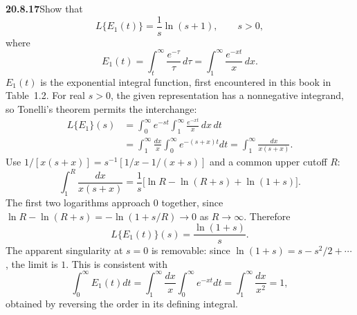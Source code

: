\par\bigskip
\noindent\textbf{20.8.17}\quad Show that
\[
L\{E_{1}(t)\}=\frac{1}{s}\ln(s+1),\qquad s>0,
\]
where
\[
E_{1}(t)=\int_{t}^{\infty}\frac{e^{-\tau}}{\tau}\,d\tau
=\int_{1}^{\infty}\frac{e^{-xt}}{x}\,dx.
\]
$E_{1}(t)$ is the exponential integral function, first
encountered in this book in Table~1.2.
\solution
For real $s>0$, the given representation has a
nonnegative integrand, so Tonelli's theorem permits the
interchange:
\begin{align*}
L\{E_1\}(s)
&=\int_0^\infty e^{-st}\int_1^\infty\frac{e^{-xt}}x\,dx\,dt\\
&=\int_1^\infty\frac{dx}{x}\int_0^\infty e^{-(s+x)t}dt
=\int_1^\infty\frac{dx}{x(s+x)}.
\end{align*}
Use $1/[x(s+x)]=s^{-1}[1/x-1/(x+s)]$ and a common upper
cutoff $R$:
\[
\int_1^R\frac{dx}{x(s+x)}
=\frac1s\big[\ln R-\ln(R+s)+\ln(1+s)\big].
\]
The first two logarithms approach $0$ together, since
$\ln R-\ln(R+s)=-\ln(1+s/R)\to0$ as $R\to\infty$. Therefore
\[
\boxed{L\{E_1(t)\}(s)=\frac{\ln(1+s)}s}.
\]
The apparent singularity at $s=0$ is removable: since
$\ln(1+s)=s-s^2/2+\cdots$, the limit is $1$. This is
consistent with
\[
\int_0^\infty E_1(t)dt
=\int_1^\infty\frac{dx}{x}\int_0^\infty e^{-xt}dt
=\int_1^\infty\frac{dx}{x^2}=1,
\]
obtained by reversing the order in its defining integral.

